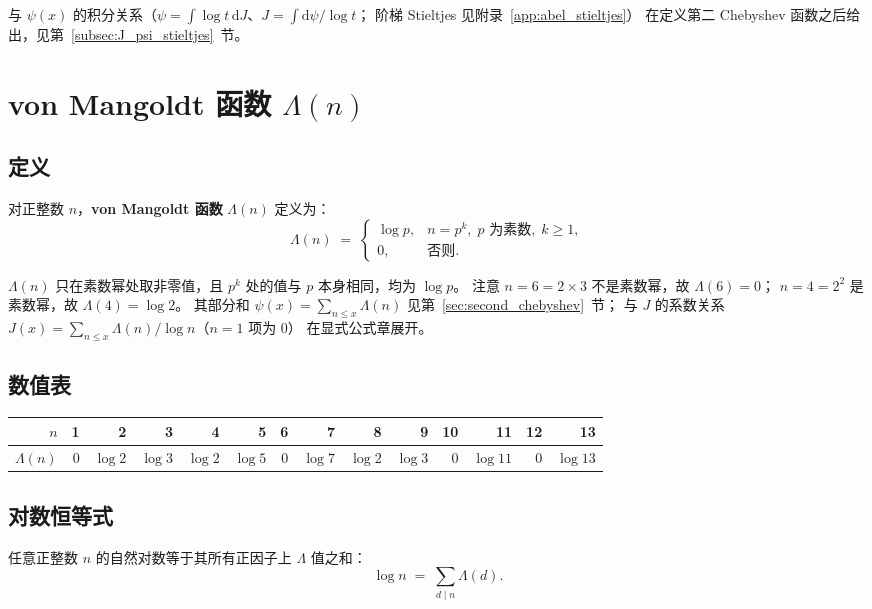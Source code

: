 与 $\psi(x)$ 的积分关系（$\psi=\int\log t\,\mathrm{d}J$、$J=\int\mathrm{d}\psi/\log t$；
阶梯 Stieltjes 见附录~\ref{app:abel_stieltjes}）
在定义第二 Chebyshev 函数之后给出，见第~\ref{subsec:J_psi_stieltjes}~节。
\section{von Mangoldt 函数 \texorpdfstring{$\Lambda(n)$}{Lambda(n)}}\label{sec:von_mangoldt}
\label{sec:Lambda}
 
\subsection{定义}
 
\begin{definition}{}{}
对正整数 $n$，\textbf{von Mangoldt 函数} $\Lambda(n)$ 定义为：
\[
  \Lambda(n) \;=\;
  \begin{cases}
    \log p, & n = p^k,\; p \text{ 为素数},\; k \geq 1, \\
    0, & \text{否则}.
  \end{cases}
\]
\end{definition}
$\Lambda(n)$ 只在素数幂处取非零值，且 $p^k$ 处的值与 $p$ 本身相同，均为 $\log p$。
注意 $n=6=2\times3$ 不是素数幂，故 $\Lambda(6)=0$；
$n=4=2^2$ 是素数幂，故 $\Lambda(4)=\log 2$。
其部分和 $\psi(x)=\sum_{n\le x}\Lambda(n)$ 见第~\ref{sec:second_chebyshev}~节；
与 $J$ 的系数关系 $J(x)=\sum_{n\le x}\Lambda(n)/\log n$（$n=1$ 项为 $0$）
在显式公式章展开。

\subsection{数值表}
 
\begin{center}
\begin{tabular}{r|rrrrrrrrrrrrr}
\toprule
$n$ & 1 & 2 & 3 & 4 & 5 & 6 & 7 & 8 & 9 & 10 & 11 & 12 & 13 \\
\midrule
$\Lambda(n)$ & $0$ & $\log 2$ & $\log 3$ & $\log 2$ & $\log 5$ & $0$ & $\log 7$
             & $\log 2$ & $\log 3$ & $0$ & $\log 11$ & $0$ & $\log 13$ \\
\bottomrule
\end{tabular}
\end{center}
 
\subsection{对数恒等式}
任意正整数 $n$ 的自然对数等于其所有正因子上 $\Lambda$ 值之和：
\begin{equation}
  \log n \;=\; \sum_{d \mid n} \Lambda(d).
\label{eq:log_sum_Lambda}
\end{equation}

